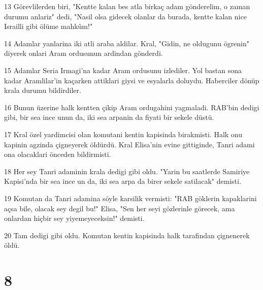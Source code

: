 \par 13 Görevlilerden biri, "Kentte kalan bes atla birkaç adam gönderelim, o zaman durumu anlariz" dedi, "Nasil olsa gidecek olanlar da burada, kentte kalan nice Israilli gibi ölüme mahkûm!"
\par 14 Adamlar yanlarina iki atli araba aldilar. Kral, "Gidin, ne oldugunu ögrenin" diyerek onlari Aram ordusunun ardindan gönderdi.
\par 15 Adamlar Seria Irmagi'na kadar Aram ordusunu izlediler. Yol bastan sona kadar Aramlilar'in kaçarken attiklari giysi ve esyalarla doluydu. Haberciler dönüp krala durumu bildirdiler.
\par 16 Bunun üzerine halk kentten çikip Aram ordugahini yagmaladi. RAB'bin dedigi gibi, bir sea ince unun da, iki sea arpanin da fiyati bir sekele düstü.
\par 17 Kral özel yardimcisi olan komutani kentin kapisinda birakmisti. Halk onu kapinin agzinda çigneyerek öldürdü. Kral Elisa'nin evine gittiginde, Tanri adami ona olacaklari önceden bildirmisti.
\par 18 Her sey Tanri adaminin krala dedigi gibi oldu. "Yarin bu saatlerde Samiriye Kapisi'nda bir sea ince un da, iki sea arpa da birer sekele satilacak" demisti.
\par 19 Komutan da Tanri adamina söyle karsilik vermisti: "RAB göklerin kapaklarini açsa bile, olacak sey degil bu!" Elisa, "Sen her seyi gözlerinle görecek, ama onlardan hiçbir sey yiyemeyeceksin!" demisti.
\par 20 Tam dedigi gibi oldu. Komutan kentin kapisinda halk tarafindan çignenerek öldü.

\chapter{8}

